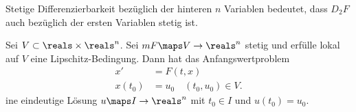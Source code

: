 \begin{bemerkung*}
  Stetige Differenzierbarkeit bezüglich der hinteren \( n \) Variablen bedeutet, dass \( D_2 F \) auch bezüglich der ersten Variablen stetig ist.
\end{bemerkung*}
\begin{satz}\label{picard-lindeloef}
  Sei \( V\subset \reals\times \reals^n  \). Sei \( mF\maps V\to \reals^n \) stetig und erfülle lokal auf \( V \) eine Lipschitz-Bedingung. Dann hat das Anfangswertproblem
  \begin{align*}
    x'&=F(t,x)\\
    x(t_0)&=u_0\quad (t_0,u_0)\in V.
  \end{align*}
  ine eindeutige Lösung \( u\maps I\to \reals^n \) mit \( t_0\in I \) und \( u(t_0)=u_0 \).
\end{satz}
